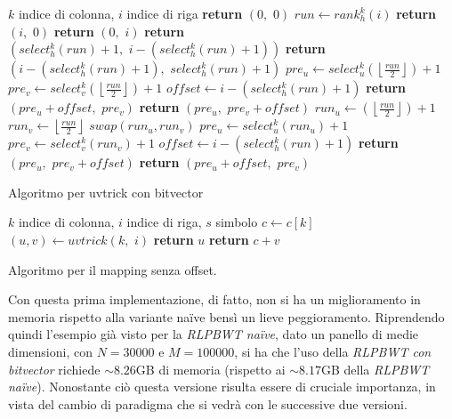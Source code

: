 \begin{algorithm}
  \begin{algorithmic}[1]
    \Comment  $k$ indice di colonna, $i$ indice di riga
    \State \textbf{return} $(0,\,\,0)$
    \EndIf
    \State $run \gets rank_h^{k}(i)$
    \State \textbf{return} $(i,\,\, 0)$
    \Else
    \State \textbf{return} $(0, \,\,i)$
    \EndIf
    \State \textbf{return} $(select_h^{k}(run)+1,\,\, i-(select_h^{k}(run)+1))$
    \Else
    \State \textbf{return} $(i-(select_h^{k}(run)+1),\,\, select_h^{k}(run)+1)$
    \EndIf
    \Else
    \State $pre_u\gets
    select_u^{k}\left(\left\lfloor\frac{run}{2}\right\rfloor\right)+1$ 
    \State $pre_v\gets
    select_v^{k}\left(\left\lfloor\frac{run}{2}\right\rfloor\right)+1$ 
    \State $offset \gets i -(select_h^{k}(run)+1)$
    \State \textbf{return} $(pre_u+offset,\,\, pre_v)$
    \Else
    \State \textbf{return} $(pre_u, \,\,pre_v+offset)$
    \EndIf
    \Else
    \State $run_u\gets \left(\left\lfloor\frac{run}{2}\right\rfloor\right)+1$
    \State $run_v\gets \left\lfloor\frac{run}{2}\right\rfloor$
    \State $swap(run_u, run_v)$
    \EndIf
    \State $pre_u\gets select_u^{k}(run_u)+1$
    \State $pre_v\gets select_v^{k}(run_v)+1$
    \State $offset \gets i -(select_h^{k}(run)+1)$
    \State \textbf{return} $(pre_u, \,\,pre_v+offset)$
    \Else
    \State \textbf{return} $(pre_u+offset, \,\,pre_v)$
    \EndIf
    \EndIf
    \EndIf
    \EndFunction
  \end{algorithmic}
  \caption{Algoritmo per uvtrick con bitvector}
  \label{algo:uvbv}
\end{algorithm}
\begin{algorithm}
  \begin{algorithmic}[1]
    \Comment $k$ indice di colonna, $i$ indice di riga, $s$ simbolo
    \State $c\gets c[k]$
    \State $(u, v) \gets uvtrick(k,\,\,i)$
    \State \textbf{return} $u$
    \Else
    \State \textbf{return} $c+v$
    \EndIf
    \EndFunction
  \end{algorithmic}
  \caption{Algoritmo per il mapping senza offset.}
  \label{algo:lfr}
\end{algorithm}
Con questa prima implementazione, di fatto, non si ha un miglioramento in
memoria rispetto alla variante na\"{i}ve bensì un lieve peggioramento.
Riprendendo quindi l'esempio già visto per la \textit{RLPBWT na\"{i}ve}, dato un
panello di 
medie dimensioni, con $N=30000$ e $M=100000$, si ha che l'uso della
\textit{RLPBWT con bitvector} richiede $\sim 8.26$GB di memoria (rispetto ai
$\sim 8.17$GB della \textit{RLPBWT na\"{i}ve}). Nonostante ciò questa versione
risulta essere di cruciale importanza, in vista del cambio di paradigma che si
vedrà con le successive due versioni.\\
